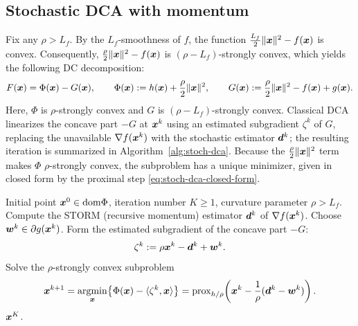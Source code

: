 \subsection{Stochastic DCA with momentum}

Fix any $\rho>L_f$. By the $L_f$-smoothness of $f$, the function
$\tfrac{L_f}{2}\|\bm{x}\|^2-f(\bm{x})$ is convex. Consequently,
$\tfrac{\rho}{2}\|\bm{x}\|^2-f(\bm{x})$ is
$(\rho-L_f)$-strongly convex, which yields the following DC decomposition:
\begin{equation}
    F(\bm{x})=\Phi(\bm{x})-G(\bm{x}),
    \qquad
    \Phi(\bm{x}):=h(\bm{x})+\frac{\rho}{2}\|\bm{x}\|^2,
    \qquad
    G(\bm{x}):=\frac{\rho}{2}\|\bm{x}\|^2-f(\bm{x})+g(\bm{x}).
    \label{eq:stoch-dca-reform}
\end{equation}
Here, $\Phi$ is $\rho$-strongly convex and $G$ is
$(\rho-L_f)$-strongly convex.
Classical DCA linearizes the concave part $-G$ at $\bm{x}^k$ using an
estimated subgradient $\zeta^k$ of $G$, replacing the unavailable
$\nabla f(\bm{x}^k)$ with the stochastic estimator $\bm{d}^k$; the resulting
iteration is summarized in Algorithm~\ref{alg:stoch-dca}. Because the
$\tfrac{\rho}{2}\|\bm{x}\|^2$ term makes $\Phi$ $\rho$-strongly convex, the
subproblem has a unique minimizer, given in closed form by the proximal
step \eqref{eq:stoch-dca-closed-form}.

\begin{algorithm}[tbp]
    \caption{\textbf{Stochastic DCA with momentum (concave-side linearization)}}
    \label{alg:stoch-dca}
    \begin{algorithmic}[1]
         Initial point $\bm{x}^0\in\mathrm{dom}\Phi$,
        iteration number $K\ge1$, curvature parameter $\rho>L_f$.
            \STATE Compute the STORM (recursive momentum) estimator
            $\bm{d}^k$ of $\nabla f(\bm{x}^k)$.
            \STATE Choose $\bm{w}^k\in\partial g(\bm{x}^k)$.
            \STATE Form the estimated subgradient of the concave part $-G$:
            \[
                \zeta^k:=\rho\bm{x}^k-\bm{d}^k+\bm{w}^k .
            \]
            \STATE Solve the $\rho$-strongly convex subproblem
            \begin{equation}
                \bm{x}^{k+1}
                =\operatorname*{\mathrm{argmin}}_{\bm{x}}\bigl\{\Phi(\bm{x})-\langle\zeta^k,\bm{x}\rangle\bigr\}
                =\mathrm{prox}_{h/\rho}\!\left(\bm{x}^k-\frac{1}{\rho}(\bm{d}^k-\bm{w}^k)\right).
                \label{eq:stoch-dca-closed-form}
            \end{equation}
        \ENDFOR
         $\bm{x}^{K}$.
    \end{algorithmic}
\end{algorithm}


